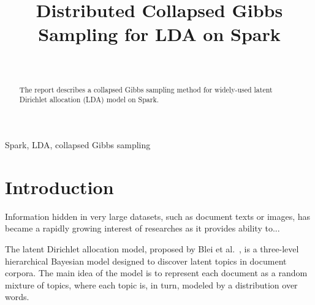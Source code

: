 \documentclass[journal]{IEEEtran}
\begin{document}
\title{Distributed Collapsed Gibbs Sampling for LDA on Spark}

\author{\\
}


\maketitle

\begin{abstract}
The report describes a collapsed Gibbs sampling method for widely-used latent Dirichlet allocation (LDA) model on Spark.
\end{abstract}

\begin{IEEEkeywords}
Spark, LDA, collapsed Gibbs sampling
\end{IEEEkeywords}


\section{Introduction}
Information hidden in very large datasets, such as document texts or images, has became a rapidly growing interest of researches as it provides ability to...

The latent Dirichlet allocation model, proposed by Blei et al.~\cite{blei2003latent}, is a three-level hierarchical Bayesian model designed to discover latent topics in document corpora. The main idea of the model is to represent each document as a random mixture of topics, where each topic is, in turn, modeled by a distribution over words. 
\end{document}

